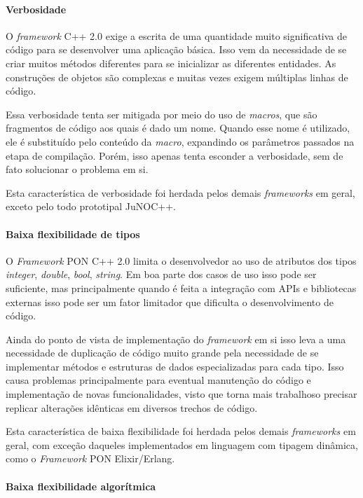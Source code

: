 \paragraph*{Verbosidade}

O \textit{framework} C++ 2.0 exige a escrita de uma quantidade muito
significativa de código para se desenvolver uma aplicação básica. Isso vem da
necessidade de se criar muitos métodos diferentes para se inicializar as
diferentes entidades. As construções de objetos são complexas e muitas vezes
exigem múltiplas linhas de código.

Essa verbosidade tenta ser mitigada por meio do uso de \textit{macros}, que são
fragmentos de código aos quais é dado um nome. Quando esse nome é utilizado, ele
é substituído pelo conteúdo da \textit{macro}, expandindo os parâmetros passados
na etapa de compilação. Porém, isso apenas tenta esconder a verbosidade, sem de
fato solucionar o problema em si.

Esta característica de verbosidade foi herdada pelos demais \textit{frameworks}
em geral, exceto pelo todo prototipal JuNOC++.

\paragraph*{Baixa flexibilidade de tipos}

O \textit{Framework} PON C++ 2.0 limita o desenvolvedor ao uso de atributos dos
tipos \textit{integer}, \textit{double}, \textit{bool}, \textit{string}. Em boa
parte dos casos de uso isso pode ser suficiente, mas principalmente quando é
feita a integração com APIs e bibliotecas externas isso pode ser um fator
limitador que dificulta o desenvolvimento de código.

Ainda do ponto de vista de implementação do \textit{framework} em si isso leva a
uma necessidade de duplicação de código muito grande pela necessidade de se
implementar métodos e estruturas de dados especializadas para cada tipo. Isso
causa problemas principalmente para eventual manutenção do código e
implementação de novas funcionalidades, visto que torna mais trabalhoso precisar
replicar alterações idênticas em diversos trechos de código.

Esta característica de baixa flexibilidade foi herdada pelos demais
\textit{frameworks} em geral, com exceção daqueles implementados em linguagem
com tipagem dinâmica, como o \textit{Framework} PON Elixir/Erlang.

\paragraph*{Baixa flexibilidade algorítmica}

